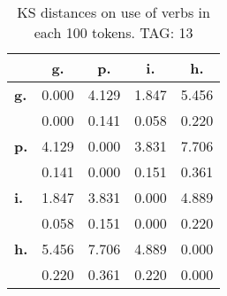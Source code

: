 \begin{table}[h!]
\begin{center}
\begin{tabular}{| l || c | c | c | c |}\hline
 & {\bf g.} & {\bf p.} & {\bf i.} & {\bf h.} \\\hline\hline
{\bf g.} & 0.000 & 4.129 & 1.847 & 5.456 \\
{\bf } & 0.000 & 0.141 & 0.058 & 0.220 \\\hline
{\bf p.} & 4.129 & 0.000 & 3.831 & 7.706 \\
{\bf } & 0.141 & 0.000 & 0.151 & 0.361 \\\hline
{\bf i.} & 1.847 & 3.831 & 0.000 & 4.889 \\
{\bf } & 0.058 & 0.151 & 0.000 & 0.220 \\\hline
{\bf h.} & 5.456 & 7.706 & 4.889 & 0.000 \\
{\bf } & 0.220 & 0.361 & 0.220 & 0.000 \\\hline
\end{tabular}
\caption{KS distances on use of verbs in each 100 tokens. TAG: 13}
\end{center}
\end{table}